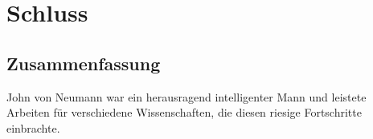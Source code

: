 
\chapter{Schluss}

\section{Zusammenfassung}
John von Neumann war ein herausragend intelligenter Mann und leistete Arbeiten für verschiedene Wissenschaften, die diesen riesige Fortschritte einbrachte.